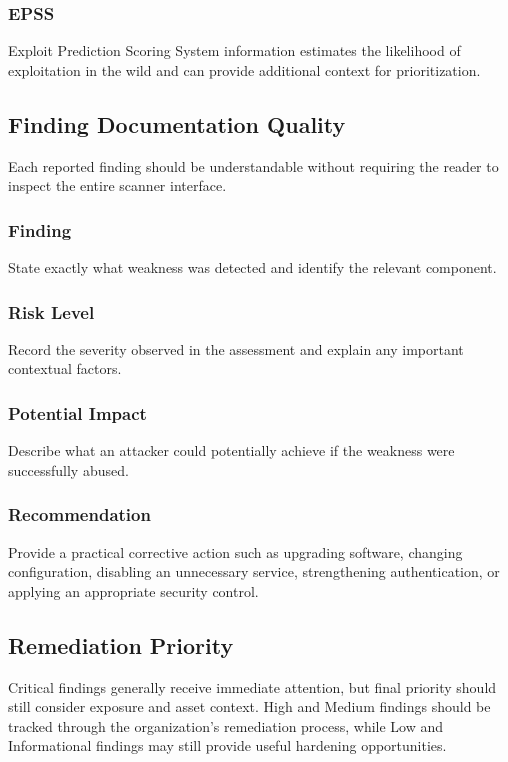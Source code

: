 \documentclass[11pt,a4paper]{article}
\begin{document}
\subsubsection{EPSS}
Exploit Prediction Scoring System information estimates the likelihood of exploitation in the wild and can provide additional context for prioritization.

\subsection{Finding Documentation Quality}
Each reported finding should be understandable without requiring the reader to inspect the entire scanner interface.

\subsubsection{Finding}
State exactly what weakness was detected and identify the relevant component.

\subsubsection{Risk Level}
Record the severity observed in the assessment and explain any important contextual factors.

\subsubsection{Potential Impact}
Describe what an attacker could potentially achieve if the weakness were successfully abused.

\subsubsection{Recommendation}
Provide a practical corrective action such as upgrading software, changing configuration, disabling an unnecessary service, strengthening authentication, or applying an appropriate security control.

\subsection{Remediation Priority}
Critical findings generally receive immediate attention, but final priority should still consider exposure and asset context. High and Medium findings should be tracked through the organization's remediation process, while Low and Informational findings may still provide useful hardening opportunities.
\end{document}
